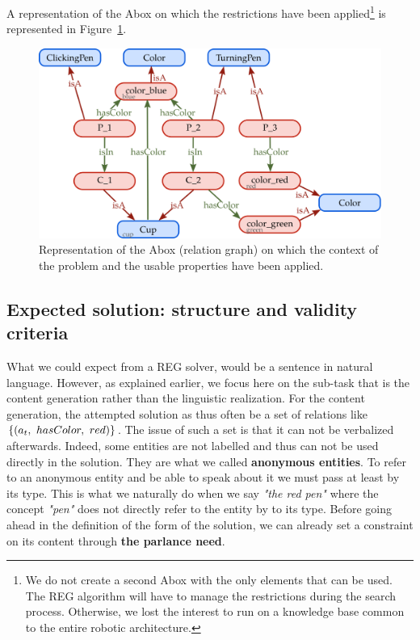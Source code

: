 A representation of the Abox on which the restrictions have been applied\footnote{We do not create a second Abox with the only elements that can be used. The REG algorithm will have to manage the restrictions during the search process. Otherwise, we lost the interest to run on a knowledge base common to the entire robotic architecture.} is represented in Figure~\ref{fig:chap4_kb_ctx}.

\begin{figure}[h!]
\centering
\includegraphics[scale=0.38]{figures/chapter4/pens_ctx.png}
\caption{\label{fig:chap4_kb_ctx} Representation of the Abox (relation graph) on which the context of the problem and the usable properties have been applied. }
\end{figure}

\subsection{Expected solution: structure and validity criteria}

What we could expect from a REG solver, would be a sentence in natural language. However, as explained earlier, we focus here on the sub-task that is the content generation rather than the linguistic realization. For the content generation, the attempted solution as thus often be a set of relations like $\{ (a_t,\ hasColor,\ red)\}$. The issue of such a set is that it can not be verbalized afterwards. Indeed, some entities are not labelled and thus can not be used directly in the solution. They are what we called \textbf{anonymous entities}. To refer to an anonymous entity and be able to speak about it we must pass at least by its type. This is what we naturally do when we say \textit{"the red pen"} where the concept \textit{"pen"} does not directly refer to the entity by to its type. Before going ahead in the definition of the form of the solution, we can already set a constraint on its content through \textbf{the parlance need}.

